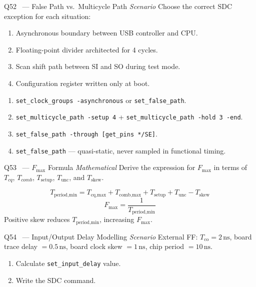 \documentclass[12pt,a4paper]{article}
\newcommand{\advanced}{%
  \fbox{\textcolor{advred}{\bfseries\sffamily\small ADVANCED}}}
\newcommand{\moderate}{%
  \fbox{\textcolor{modoran}{\bfseries\sffamily\small MODERATE}}}
\begin{document}
\begin{questionbox}{Q52 \advanced\ --- False Path vs.\ Multicycle Path \hfill\textit{Scenario}}
Choose the correct SDC exception for each situation:
\begin{enumerate}
  \item Asynchronous boundary between USB controller and CPU.
  \item Floating-point divider architected for 4 cycles.
  \item Scan shift path between SI and SO during test mode.
  \item Configuration register written only at boot.
\end{enumerate}
\end{questionbox}

\begin{answerbox}
\begin{enumerate}
  \item \texttt{set\_clock\_groups -asynchronous} or \texttt{set\_false\_path}.
  \item \texttt{set\_multicycle\_path -setup 4} + \texttt{set\_multicycle\_path -hold 3 -end}.
  \item \texttt{set\_false\_path -through [get\_pins */SE]}.
  \item \texttt{set\_false\_path} --- quasi-static, never sampled in functional timing.
\end{enumerate}
\end{answerbox}

\begin{questionbox}{Q53 \moderate\ --- $F_{\max}$ Formula \hfill\textit{Mathematical}}
Derive the expression for $F_{\max}$ in terms of $T_{cq}$, $T_{comb}$, $T_{\text{setup}}$, $T_{\text{unc}}$, and $T_{\text{skew}}$.
\end{questionbox}

\begin{answerbox}
\[
T_{\text{period,min}} = T_{\text{cq,max}} + T_{\text{comb,max}} + T_{\text{setup}} + T_{\text{unc}} - T_{\text{skew}}
\]
\[
\boxed{F_{\max} = \frac{1}{T_{\text{period,min}}}}
\]
Positive skew reduces $T_{\text{period,min}}$, increasing $F_{\max}$.
\end{answerbox}

\begin{questionbox}{Q54 \advanced\ --- Input/Output Delay Modelling \hfill\textit{Scenario}}
External FF: $T_{\text{co}}=2\,\text{ns}$, board trace delay $= 0.5\,\text{ns}$, board clock skew $= 1\,\text{ns}$, chip period $= 10\,\text{ns}$.
\begin{enumerate}[label=\textbf{\alph*)}]
  \item Calculate \texttt{set\_input\_delay} value.
  \item Write the SDC command.
\end{enumerate}
\end{questionbox}
\end{document}
